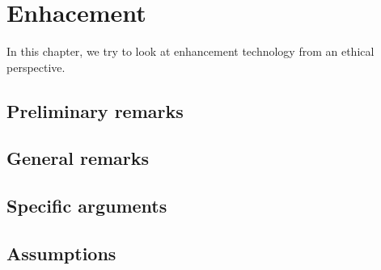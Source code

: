 \documentclass[../summary.tex]{subfiles}
\begin{document}
	
	\section{Enhacement}
		In this chapter, we try to look at enhancement technology from an ethical perspective. 
		\subsection{Preliminary remarks}
		\subsection{General remarks}
		\subsection{Specific arguments}
		\subsection{Assumptions}
		
\end{document}
